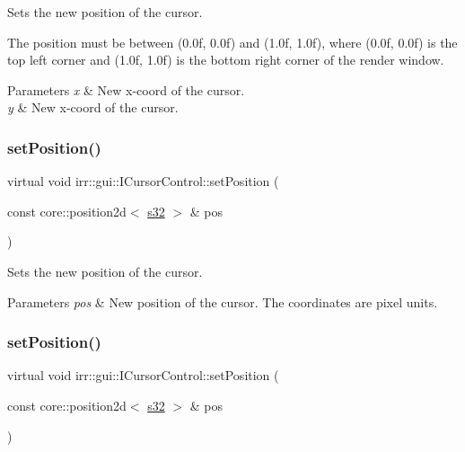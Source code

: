 Sets the new position of the cursor. 

The position must be between (0.\+0f, 0.\+0f) and (1.\+0f, 1.\+0f), where (0.\+0f, 0.\+0f) is the top left corner and (1.\+0f, 1.\+0f) is the bottom right corner of the render window. 
\begin{DoxyParams}{Parameters}
{\em x} & New x-\/coord of the cursor. \\
\hline
{\em y} & New x-\/coord of the cursor. \\
\hline
\end{DoxyParams}
\mbox{\label{classirr_1_1gui_1_1ICursorControl_a421c770ffc494f8f6082a16bef0feed2}} 
\subsubsection{\texorpdfstring{set\+Position()}{setPosition()}\hspace{0.1cm}{\footnotesize\ttfamily [5/8]}}
{\footnotesize\ttfamily virtual void irr\+::gui\+::\+I\+Cursor\+Control\+::set\+Position (\begin{DoxyParamCaption}\item[{const core\+::position2d$<$ \hyperlink{namespaceirr_ac66849b7a6ed16e30ebede579f9b47c6}{s32} $>$ \&}]{pos }\end{DoxyParamCaption})\hspace{0.3cm}{\ttfamily [pure virtual]}}



Sets the new position of the cursor. 


\begin{DoxyParams}{Parameters}
{\em pos} & New position of the cursor. The coordinates are pixel units. \\
\hline
\end{DoxyParams}
\mbox{\label{classirr_1_1gui_1_1ICursorControl_a421c770ffc494f8f6082a16bef0feed2}} 
\subsubsection{\texorpdfstring{set\+Position()}{setPosition()}\hspace{0.1cm}{\footnotesize\ttfamily [6/8]}}
{\footnotesize\ttfamily virtual void irr\+::gui\+::\+I\+Cursor\+Control\+::set\+Position (\begin{DoxyParamCaption}\item[{const core\+::position2d$<$ \hyperlink{namespaceirr_ac66849b7a6ed16e30ebede579f9b47c6}{s32} $>$ \&}]{pos }\end{DoxyParamCaption})\hspace{0.3cm}{\ttfamily [pure virtual]}}



